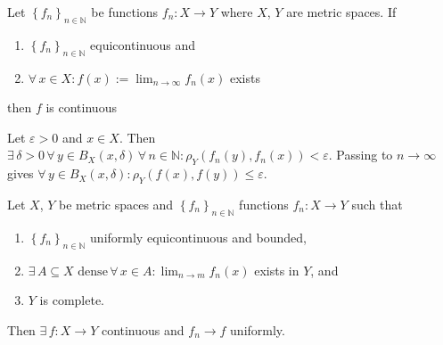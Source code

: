 \documentclass{notes}
\begin{document}
\begin{lem}
  Let $\left \{ f_n \right \}_{n \in \mathbb N}$ be functions $f_n \colon X \to Y$ where $X$, $Y$ are metric spaces.
  If 
  \begin{enumerate}
    \item $\left \{ f_n \right \}_{n \in \mathbb N}$ equicontinuous and 
    
    \item $\forall \, x \in X: f(x) := \lim_{n \to \infty} f_n(x)$ exists
  \end{enumerate}
  then $f$ is continuous
\end{lem}

\begin{prf}
  Let $\varepsilon > 0$ and $x \in X$.
  Then $\exists \, \delta > 0 \, \forall \, y \in B_X(x, \delta) \, \forall \, n \in \mathbb N: \rho_Y(f_n(y), f_n(x)) < \varepsilon$.
  Passing to $n \to \infty$ gives $\forall \, y \in B_X(x, \delta): \rho_Y(f(x), f(y)) \leq \varepsilon$.
\end{prf}

\newpage

\begin{lem}
  Let $X$, $Y$ be metric spaces and $\left \{ f_n \right \}_{n \in \mathbb N}$ functions $f_n \colon X \to Y$ such that 
  \begin{enumerate}
    \item $\left \{ f_n \right \}_{n \in \mathbb N}$ uniformly equicontinuous and bounded, 

    \item $\exists \, A \subseteq X \text{ dense} \, \forall \, x \in A: \lim_{n \to m} f_n(x)$ exists in $Y$, and 

    \item $Y$ is complete.
  \end{enumerate}
  
  Then $\exists \, f \colon X \to Y$ continuous and $f_n \to f$ uniformly.
\end{lem}
\end{document}
